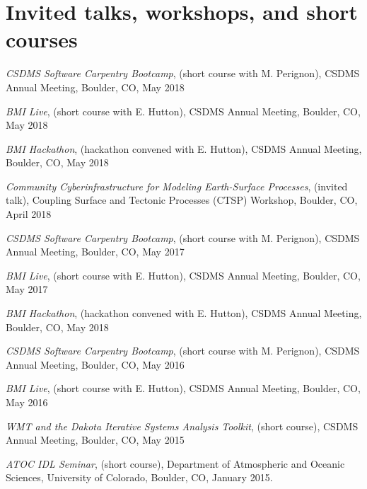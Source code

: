 \section{Invited talks, workshops, and short courses}
\vspace{0.5em}

\begin{enumerate}[{[}1{]}]

  \item \textit{CSDMS Software Carpentry Bootcamp}, (short course with
    M. Perignon), CSDMS Annual Meeting, Boulder, CO, May 2018

  \item \textit{BMI Live}, (short course with E. Hutton),
    CSDMS Annual Meeting, Boulder, CO, May 2018

  \item \textit{BMI Hackathon}, (hackathon convened with E. Hutton),
    CSDMS Annual Meeting, Boulder, CO, May 2018

  \item \textit{Community Cyberinfrastructure for Modeling
    Earth-Surface Processes}, (invited talk), Coupling Surface and
    Tectonic Processes (CTSP) Workshop, Boulder, CO, April 2018

  \item \textit{CSDMS Software Carpentry Bootcamp}, (short course with
    M. Perignon), CSDMS Annual Meeting, Boulder, CO, May 2017

  \item \textit{BMI Live}, (short course with E. Hutton),
    CSDMS Annual Meeting, Boulder, CO, May 2017

  \item \textit{BMI Hackathon}, (hackathon convened with E. Hutton),
    CSDMS Annual Meeting, Boulder, CO, May 2018

  \item \textit{CSDMS Software Carpentry Bootcamp}, (short course with
    M. Perignon), CSDMS Annual Meeting, Boulder, CO, May 2016

  \item \textit{BMI Live}, (short course with E. Hutton),
    CSDMS Annual Meeting, Boulder, CO, May 2016

  \item \textit{WMT and the Dakota Iterative Systems Analysis Toolkit},
    (short course), CSDMS Annual Meeting, Boulder, CO, May 2015

  \item \textit{ATOC IDL Seminar}, (short course), Department of
    Atmospheric and Oceanic Sciences, University of Colorado, Boulder,
    CO, January 2015.


\end{enumerate}
